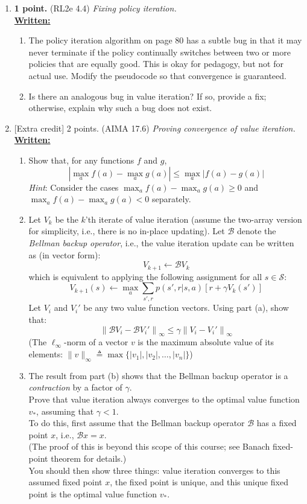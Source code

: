 \documentclass{article}
\begin{document}
\begin{enumerate}
\item \textbf{1 point.} (RL2e 4.4) \textit{Fixing policy iteration.} \\
\uline{\textbf{Written:}}
\begin{enumerate}
\item The policy iteration algorithm on page 80 has a subtle bug in that it may never terminate if the policy continually switches between two or more policies that are equally good. This is okay for pedagogy, but not for actual use. Modify the pseudocode so that convergence is guaranteed.

\item Is there an analogous bug in value iteration? If so, provide a fix; otherwise, explain why such a bug does not exist.

\end{enumerate}

\item {{[Extra credit]} 2 points.} (AIMA 17.6) \textit{Proving convergence of value iteration.} \\
\uline{\textbf{Written:}}
\begin{enumerate}
\item Show that, for any functions $f$ and $g$,
\[ \left| \max_a f(a) - \max_a g(a) \right| \leq \max_a \left| f(a) - g(a) \right| \]
\textit{Hint}: Consider the cases $\max_a f(a) - \max_a g(a) \geq 0$ and $\max_a f(a) - \max_a g(a) < 0$ separately.

\item Let $V_k$ be the $k$'th iterate of value iteration (assume the two-array version for simplicity, i.e., there is no in-place updating).
Let $\mathcal{B}$ denote the \textit{Bellman backup operator}, i.e., the value iteration update can be written as (in vector form):
\[ V_{k+1} \leftarrow \mathcal{B} V_k \]
which is equivalent to applying the following assignment for all $s \in \mathcal{S}$:
\[ V_{k+1}(s) \leftarrow \max_a \sum_{s',r} p(s',r | s,a) \left[ r + \gamma V_k(s') \right] \]
Let $V_i$ and $V_i'$ be any two value function vectors. Using part (a), show that:
\[ \left\| \mathcal{B} V_i - \mathcal{B} V_i' \right\|_\infty \leq \gamma \left\| V_i - V_i' \right\|_\infty \]
(The $\ell_\infty$-norm of a vector $v$ is the maximum absolute value of its elements: $\| v \|_\infty \triangleq \max \{ |v_1|, |v_2|, \ldots, |v_n| \}$)

\item The result from part (b) shows that the Bellman backup operator is a \textit{contraction} by a factor of $\gamma$. \\
Prove that value iteration always converges to the optimal value function $v_*$, assuming that $\gamma < 1$. \\
To do this, first assume that the Bellman backup operator $\mathcal{B}$ has a fixed point $x$, i.e., $\mathcal{B} x = x$. \\
(The proof of this is beyond this scope of this course; see Banach fixed-point theorem for details.) \\
You should then show three things: value iteration converges to this assumed fixed point $x$, the fixed point is unique, and this unique fixed point is the optimal value function $v_*$.


\end{enumerate}
\end{enumerate}
\end{document}
